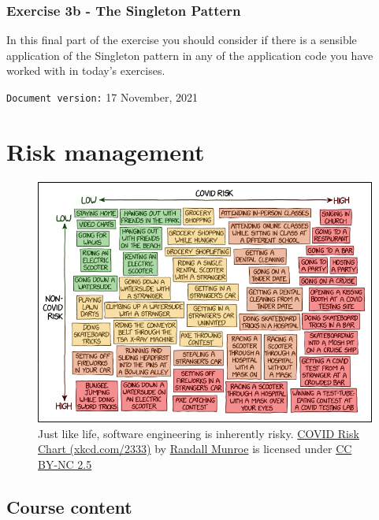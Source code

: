 \documentclass[
]{book}
\begin{document}
\hypertarget{singleton}{%
\subsection{Exercise 3b - The Singleton Pattern}\label{singleton}}

In this final part of the exercise you should consider if there is a sensible application of the Singleton pattern in any of the application code you have worked with in today's exercises.

\texttt{Document\ version:} 17 November, 2021

\hypertarget{risking}{%
\chapter{Risk management}\label{risking}}

\begin{figure}

{\centering \includegraphics[width=0.99\linewidth]{images/covid_risk_chart} 

}

\caption{Just like life, software engineering is inherently risky. \href{https://xkcd.com/2333/}{COVID Risk Chart (xkcd.com/2333)} by \href{https://en.wikipedia.org/wiki/Randall_Munroe}{Randall Munroe} is licensed under \href{https://creativecommons.org/licenses/by-nc/2.5/}{CC BY-NC 2.5}}\label{fig:xkcd-risk-fig}
\end{figure}



\hypertarget{course-content-2}{%
\section{Course content}\label{course-content-2}}
\end{document}

